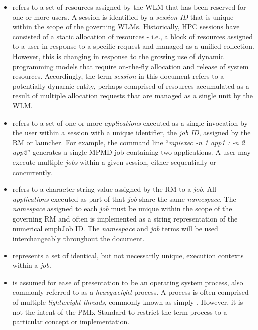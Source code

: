 \begin{itemize}

\item {} 
refers to a set of resources assigned by the \ac{WLM} that has been 
reserved for one or more users. 
A session is identified by a \emph{session ID} that is  
unique within the scope of the governing \acp{WLM}.
Historically, \ac{HPC} sessions have consisted of a static allocation of resources - i.e., a block of resources assigned to a user in response to a specific request and managed as a unified collection. However, this is changing in response to the growing use of dynamic programming models that require on-the-fly allocation and release of system resources. Accordingly, the term \emph{session} in this document refers to a potentially dynamic entity, perhaps comprised of resources accumulated as a result of multiple allocation requests that are managed as a single unit by the \ac{WLM}.

\item {} refers to a set of one or more \emph{applications} executed as a single invocation by the user within a session with a unique identifier, the \emph{job ID}, assigned by the \ac{RM} or launcher. For example, the command line ``\textit{mpiexec -n 1 app1 : -n 2 app2}'' generates a single \ac{MPMD} job containing two applications. A user may execute multiple \emph{jobs} within a given session, either sequentially or concurrently.

\item {} refers to a character string value assigned by the \ac{RM} to a \textit{job}.  All \textit{applications} executed as part of that \textit{job} share the same \emph{namespace}. The \emph{namespace} assigned to each \emph{job} must be unique within the scope of the governing \ac{RM} and often is implemented as a string representation of the numerical emph{Job ID}. The \emph{namespace} and \emph{job} terms will be used interchangeably throughout the document.

\item {} represents a set of identical, but not necessarily unique,
execution contexts within a \emph{job}.

\item {} is assumed for ease of presentation to be an operating system process, also commonly referred to as a \emph{heavyweight} process. A process is often comprised of multiple \emph{lightweight threads}, commonly known as simply .  However, it is not the intent of the \ac{PMIx} Standard to restrict the term process to a particular concept or implementation.


\end{itemize}
